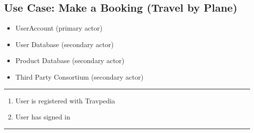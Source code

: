 \vspace{4ex}
\hspace{-4.2cm}
\begin{minipage}[h][][s]{\linewidth}
	\subsection{Use Case: Make a Booking (Travel by Plane)}
\end{minipage}

\begin{itemize}
	\item UserAccount (primary actor)
	\item User Database  (secondary actor)
	\item Product Database  (secondary actor)
	\item Third Party Consortium (secondary actor)
\end{itemize}
\noindent\rule{\textwidth}{0.6pt}

\begin{enumerate}
	\item User is registered with Travpedia
	\item User has signed in
\end{enumerate}
\noindent\rule{\textwidth}{0.6pt}

